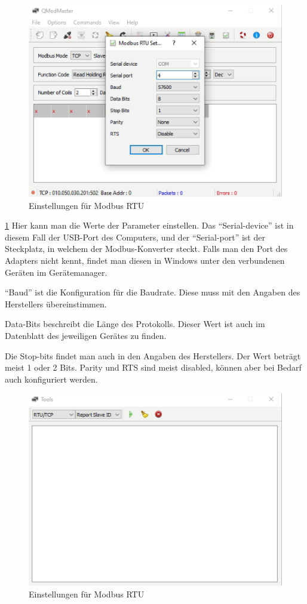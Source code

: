 \begin{figure}[h p] 
    \centering
    \includegraphics[scale=0.35]{pics/Settingsforqmodmaster.png}
    \caption{Einstellungen für Modbus RTU}
    \label{fig:impl:Settingsforqmodmaster}
\end{figure}


\ref{fig:impl:Settingsforqmodmaster} Hier kann man die Werte der Parameter einstellen. Das “Serial-device” ist in diesem Fall der USB-Port des Computers, und der “Serial-port” ist der Steckplatz, in welchem der Modbus-Konverter steckt. Falls man den Port des Adapters nicht kennt, findet man diesen in Windows unter den verbundenen Geräten im Gerätemanager.  

“Baud” ist die Konfiguration für die Baudrate. Diese muss mit den Angaben des Herstellers übereinstimmen.  

Data-Bits beschreibt die Länge des Protokolls. Dieser Wert ist auch im Datenblatt des jeweiligen Gerätes zu finden.  

Die Stop-bits findet man auch in den Angaben des Herstellers. Der Wert beträgt meist 1 oder 2 Bits. Parity und RTS sind meist disabled, können aber bei Bedarf auch konfiguriert werden.  

\begin{figure}[h p] 
    \centering
    \includegraphics[scale=0.35]{pics/ToolsQModbusMaster.png}
    \caption{Einstellungen für Modbus RTU}
    \label{fig:impl:ToolsQModbusMaster}
\end{figure}

